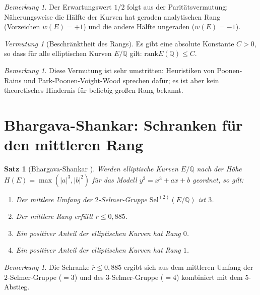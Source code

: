 \documentclass[12pt,a4paper]{amsart}
\newtheorem{satz}[theorem]{Satz}
\theoremstyle{definition}
\theoremstyle{remark}
\newtheorem{bemerkung}[theorem]{Bemerkung}
\newtheorem{vermutung}[theorem]{Vermutung}
\newcommand{\Q}{\mathbb{Q}}
\newcommand{\Sel}{\mathrm{Sel}}
\newcommand{\rank}{\mathrm{rank}}
\begin{document}
\begin{bemerkung}
  Der Erwartungswert $1/2$ folgt aus der Paritätsvermutung: Näherungsweise die Hälfte
  der Kurven hat geraden analytischen Rang (Vorzeichen $w(E) = +1$) und die andere Hälfte
  ungeraden ($w(E) = -1$).
\end{bemerkung}

\begin{vermutung}[Beschränktheit des Rangs]\label{verm:beschraenkt}
  Es gibt eine absolute Konstante $C > 0$, so dass für alle elliptischen Kurven $E/\Q$
  gilt: $\rank E(\Q) \leq C$.
\end{vermutung}

\begin{bemerkung}
  Diese Vermutung ist sehr umstritten: Heuristiken von Poonen-Rains \cite{PR2012} und
  Park-Poonen-Voight-Wood \cite{PPVW2019} sprechen dafür; es ist aber kein theoretisches
  Hindernis für beliebig großen Rang bekannt.
\end{bemerkung}

\section{Bhargava-Shankar: Schranken für den mittleren Rang}\label{sec:bhargava}

\begin{satz}[Bhargava-Shankar \cite{BS2015}]\label{satz:bs}
  Werden elliptische Kurven $E/\Q$ nach der Höhe $H(E) = \max(|a|^3, |b|^2)$
  für das Modell $y^2 = x^3 + ax + b$ geordnet, so gilt:
  \begin{enumerate}[label=(\roman*)]
    \item Der mittlere Umfang der $2$-Selmer-Gruppe $\Sel^{(2)}(E/\Q)$ ist $3$.
    \item Der mittlere Rang erfüllt $\overline{r} \leq 0{,}885$.
    \item Ein positiver Anteil der elliptischen Kurven hat Rang $0$.
    \item Ein positiver Anteil der elliptischen Kurven hat Rang $1$.
  \end{enumerate}
\end{satz}

\begin{bemerkung}
  Die Schranke $\overline{r} \leq 0{,}885$ ergibt sich aus dem mittleren Umfang der
  $2$-Selmer-Gruppe ($= 3$) und des $3$-Selmer-Gruppe ($= 4$) kombiniert mit dem
  $5$-Abstieg.
\end{bemerkung}
\end{document}
